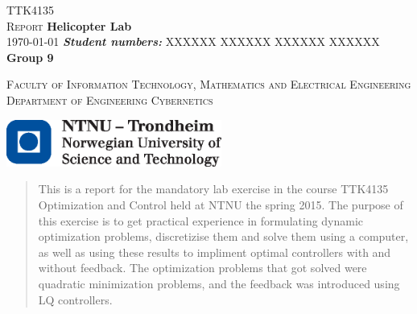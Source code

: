 \documentclass[a4paper,12pt,draft]{article}
\begin{document}
\begin{titlepage}
\begin{center}

\textsc{\LARGE TTK4135}\\[1.5cm]
\textsc{\LARGE Report} \linebreak
{ \huge \bfseries \textcolor[rgb]{0,0,1}{Helicopter Lab}\\[0.5cm] }
\today \vspace{1cm} \linebreak 
\emph{\textbf{Student numbers:}}  \linebreak
XXXXXX \linebreak
XXXXXX \linebreak
XXXXXX \linebreak
XXXXXX \linebreak\linebreak \textbf{Group 9}  \vspace{3cm}\linebreak \linebreak

\textsc{Faculty of Information Technology, Mathematics and Electrical Engineering}\linebreak
\textsc{Department of Engineering Cybernetics} 
\vfill


\includegraphics[width=200pt, keepaspectratio=true]{logo_ntnu_eng.eps}

\end{center}
\end{titlepage}
\begin{abstract}

This is a report for the mandatory lab exercise in the course TTK4135 Optimization and Control held at NTNU the spring 2015. The purpose of this exercise is to get practical experience in formulating dynamic optimization problems, discretizise them and solve them using a computer, as well as using these results to impliment optimal controllers with and without feedback. The optimization problems that got solved were quadratic minimization problems, and the feedback was introduced using LQ controllers.

\end{abstract}

\tableofcontents








%


\end{document}
